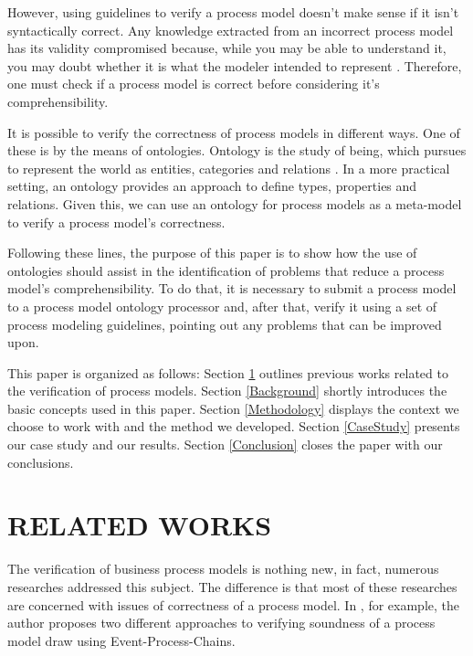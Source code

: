 \documentclass[a4paper,twoside]{article}
\begin{document}
However, using guidelines to verify a process model doesn't make sense if it isn't syntactically correct. Any knowledge extracted from an incorrect process model has its validity compromised because, while you may be able to understand it, you may doubt whether it is what the modeler intended to represent \cite{Reijers2015}. Therefore, one must check if a process model is correct before considering it's comprehensibility.


It is possible to verify the correctness of process models in  different ways. One of these is by the means of ontologies. Ontology is the study of being, which pursues to represent the world as entities, categories and relations \cite{Mendling2008}. In a more practical setting, an ontology provides an approach to define types, properties and relations. Given this, we can use an ontology for process models as a meta-model to verify a process model's correctness.


Following these lines, the purpose of this paper is to show how the use of ontologies should assist in the identification of problems that reduce a process model's comprehensibility. To do that, it is necessary to submit a process model to a process model ontology processor and, after that, verify it using a set of process modeling guidelines, pointing out any problems that can be improved upon.


This paper is organized as follows: Section \ref{RelatedWorks} outlines previous works related to the verification of process models. Section \ref{Background} shortly introduces the basic concepts used in this paper. Section \ref{Methodology} displays the context we choose to work with and the method we developed. Section \ref{CaseStudy} presents our case study and our results. Section \ref{Conclusion} closes the paper with our conclusions.

\section{RELATED WORKS}\label{RelatedWorks}


\noindent The verification of business process models is nothing new, in fact, numerous researches addressed this subject. The difference is that most of these researches are concerned with issues of correctness of a process model. In \cite{Mendling2008}, for example, the author proposes two different approaches to verifying soundness of a process model draw using Event-Process-Chains.
	
\end{document}
